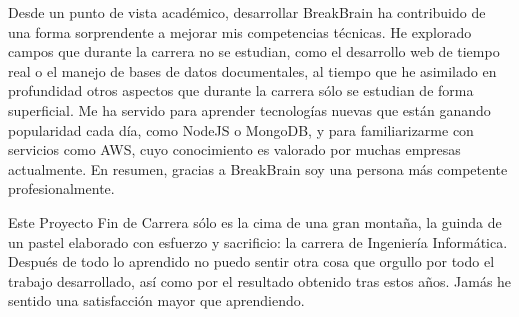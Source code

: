 Desde un punto de vista académico, desarrollar BreakBrain ha contribuido de una forma sorprendente a mejorar mis competencias técnicas. He explorado campos que durante la carrera no se estudian, como el desarrollo web de tiempo real o el manejo de bases de datos documentales, al tiempo que he asimilado en profundidad otros aspectos que durante la carrera sólo se estudian de forma superficial. Me ha servido para aprender tecnologías nuevas que están ganando popularidad cada día, como NodeJS o MongoDB, y para familiarizarme con servicios como \acf{AWS}, cuyo conocimiento es valorado por muchas empresas actualmente. En resumen, gracias a BreakBrain soy una persona más competente profesionalmente.

Este Proyecto Fin de Carrera sólo es la cima de una gran montaña, la guinda de un pastel elaborado con esfuerzo y sacrificio: la carrera de Ingeniería Informática. Después de todo lo aprendido no puedo sentir otra cosa que orgullo por todo el trabajo desarrollado, así como por el resultado obtenido tras estos años. Jamás he sentido una satisfacción mayor que aprendiendo.




